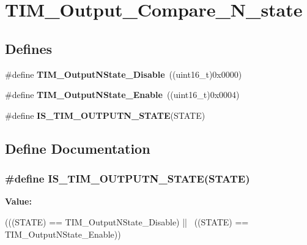 \hypertarget{group__TIM__Output__Compare__N__state}{
\section{TIM\_\-Output\_\-Compare\_\-N\_\-state}
\label{group__TIM__Output__Compare__N__state}
}
\subsection*{Defines}
\begin{DoxyCompactItemize}
\item 
\hypertarget{group__TIM__Output__Compare__N__state_gade8506a50fd6ba58273e9da81f6b0b54}{
\#define {\bfseries TIM\_\-OutputNState\_\-Disable}~((uint16\_\-t)0x0000)}
\label{group__TIM__Output__Compare__N__state_gade8506a50fd6ba58273e9da81f6b0b54}

\item 
\hypertarget{group__TIM__Output__Compare__N__state_gac4c08f9d66ce138c6978668020526c6f}{
\#define {\bfseries TIM\_\-OutputNState\_\-Enable}~((uint16\_\-t)0x0004)}
\label{group__TIM__Output__Compare__N__state_gac4c08f9d66ce138c6978668020526c6f}

\item 
\#define {\bfseries IS\_\-TIM\_\-OUTPUTN\_\-STATE}(STATE)
\end{DoxyCompactItemize}


\subsection{Define Documentation}
\hypertarget{group__TIM__Output__Compare__N__state_ga81e27a982d9707f699451f30314c4274}{
\subsubsection[{IS\_\-TIM\_\-OUTPUTN\_\-STATE}]{\setlength{\rightskip}{0pt plus 5cm}\#define IS\_\-TIM\_\-OUTPUTN\_\-STATE(STATE)}}
\label{group__TIM__Output__Compare__N__state_ga81e27a982d9707f699451f30314c4274}
{\bfseries Value:}
\begin{DoxyCode}
(((STATE) == TIM_OutputNState_Disable) || \
                                     ((STATE) == TIM_OutputNState_Enable))
\end{DoxyCode}
